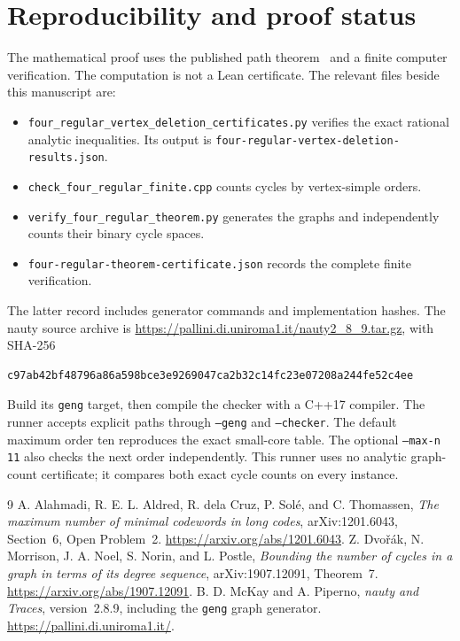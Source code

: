 \documentclass[11pt]{article}
\begin{document}
\section{Reproducibility and proof status}

The mathematical proof uses the published path theorem~\cite{dmnnp} and a finite computer verification.
The computation is not a Lean certificate.
The relevant files beside this manuscript are:
\begin{itemize}
\item \nolinkurl{four_regular_vertex_deletion_certificates.py} verifies the exact rational analytic inequalities.
Its output is \nolinkurl{four-regular-vertex-deletion-results.json}.
\item \nolinkurl{check_four_regular_finite.cpp} counts cycles by vertex-simple orders.
\item \nolinkurl{verify_four_regular_theorem.py} generates the graphs and independently counts their binary cycle spaces.
\item \nolinkurl{four-regular-theorem-certificate.json} records the complete finite verification.
\end{itemize}
The latter record includes generator commands and implementation hashes.
The nauty source archive is
\url{https://pallini.di.uniroma1.it/nauty2_8_9.tar.gz}, with SHA-256
\begin{verbatim}
c97ab42bf48796a86a598bce3e9269047ca2b32c14fc23e07208a244fe52c4ee
\end{verbatim}
Build its \texttt{geng} target, then compile the checker with a C++17 compiler.
The runner accepts explicit paths through \texttt{--geng} and \texttt{--checker}.
The default maximum order ten reproduces the exact small-core table.
The optional \texttt{--max-n 11} also checks the next order independently.
This runner uses no analytic graph-count certificate; it compares both exact cycle counts on every instance.

\begin{thebibliography}{9}
A. Alahmadi, R. E. L. Aldred, R. dela Cruz, P. Sol\'e, and C. Thomassen,
\emph{The maximum number of minimal codewords in long codes},
arXiv:1201.6043, Section~6, Open Problem~2.
\url{https://arxiv.org/abs/1201.6043}.
Z. Dvo\v r\'ak, N. Morrison, J. A. Noel, S. Norin, and L. Postle,
\emph{Bounding the number of cycles in a graph in terms of its degree sequence},
arXiv:1907.12091, Theorem~7.
\url{https://arxiv.org/abs/1907.12091}.
B. D. McKay and A. Piperno,
\emph{nauty and Traces}, version~2.8.9, including the \texttt{geng} graph generator.
\url{https://pallini.di.uniroma1.it/}.
\end{thebibliography}
\end{document}
